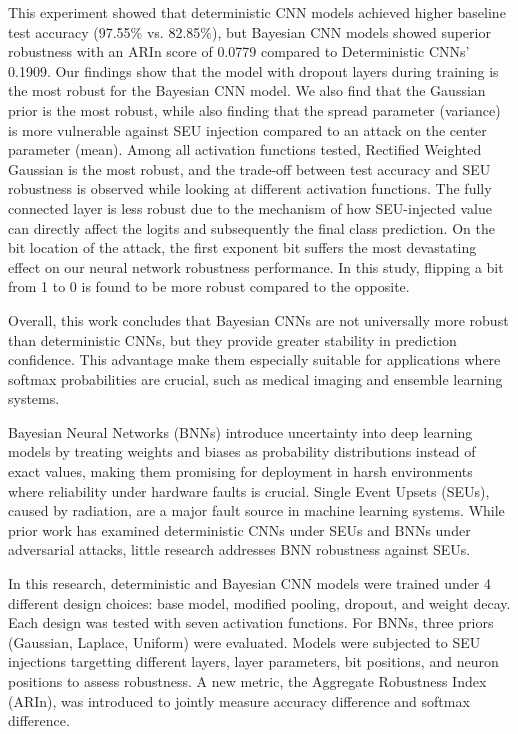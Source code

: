 \documentclass[ %
                    author={Revalda Putawara},
                supervisor={Dr. James Pope},
                    degree={MSc},
                     title={Robustness of Bayesian Neural Networks Design Choices Against Weight and Bias Perturbation Induced by Single Event Upsets (SEUs)},
                      type={},
                      year={2025}]{dissertation}
\begin{document}
This experiment showed that deterministic CNN models achieved higher baseline test accuracy (97.55\% vs. 82.85\%), but Bayesian CNN models showed superior robustness with an ARIn score of 0.0779 compared to Deterministic CNNs' 0.1909. Our findings show that the model with dropout layers during training is the most robust for the Bayesian CNN model. We also find that the Gaussian prior is the most robust, while also finding that the spread parameter (variance) is more vulnerable against SEU injection compared to an attack on the center parameter (mean). Among all activation functions tested, Rectified Weighted Gaussian is the most robust, and the trade-off between test accuracy and SEU robustness is observed while looking at different activation functions. The fully connected layer is less robust due to the mechanism of how SEU-injected value can directly affect the logits and subsequently the final class prediction. On the bit location of the attack, the first exponent bit suffers the most devastating effect on our neural network robustness performance. In this study, flipping a bit from 1 to 0 is found to be more robust compared to the opposite. %

Overall, this work concludes that Bayesian CNNs are not universally more robust than deterministic CNNs, but they provide greater stability in prediction confidence. This advantage make them especially suitable for applications where softmax probabilities are crucial, such as medical imaging and ensemble learning systems.
\fi

Bayesian Neural Networks (BNNs) introduce uncertainty into deep learning models by treating weights and biases as probability distributions instead of exact values, making them promising for deployment in harsh environments where reliability under hardware faults is crucial. Single Event Upsets (SEUs), caused by radiation, are a major fault source in machine learning systems. While prior work has examined deterministic CNNs under SEUs and BNNs under adversarial attacks, little research addresses BNN robustness against SEUs. 

In this research, deterministic and Bayesian CNN models were trained under 4 different design choices: base model, modified pooling, dropout, and weight decay. Each design was tested with seven activation functions. For BNNs, three priors (Gaussian, Laplace, Uniform) were evaluated. Models were subjected to SEU injections targetting different layers, layer parameters, bit positions, and neuron positions to assess robustness. A new metric, the Aggregate Robustness Index (ARIn), was introduced to jointly measure accuracy difference and softmax difference.
\end{document}
